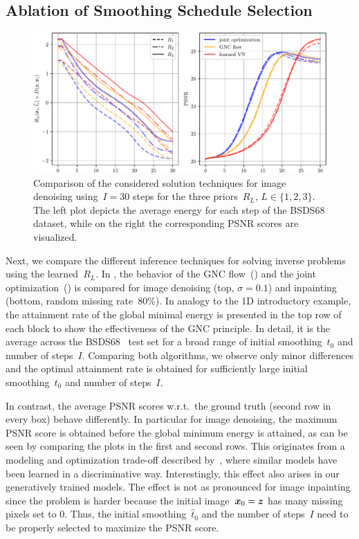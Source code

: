 \documentclass{article}
\def\hatt{{\widehat{t}}}
\theoremstyle{plain}
\theoremstyle{definition}
\theoremstyle{remark}
\begin{document}
\subsection{Ablation of Smoothing Schedule Selection}
\begin{figure}[t]
\centering
\includegraphics[width=.9\linewidth]{figures/results/plots_denoise}
\caption{
Comparison of the considered solution techniques for image denoising using~$I=30$ steps for the three priors~$R_L$, $L\in\{1,2,3\}$.
The left plot depicts the average energy for each step of the BSDS68 dataset, while on the right the corresponding PSNR scores are visualized.
}
\label{fig:allThreeComparison}
\end{figure}
Next, we compare the different inference techniques for solving inverse problems using the learned~$R_L$.
In , the behavior of the GNC flow~() and the joint optimization~() is compared for image denoising (top, $\sigma=0.1$) and inpainting (bottom, random missing rate~$80\%$).
In analogy to the 1D introductory example, the attainment rate of the global minimal energy is presented in the top row of each block to show the effectiveness of the GNC principle.
In detail, it is the average across the BSDS68~\cite{MaFo01} test set for a broad range of initial smoothing~$t_0$ and number of steps~$I$.
Comparing both algorithms, we observe only minor differences and the optimal attainment rate is obtained for sufficiently large initial smoothing~$t_0$ and number of steps~$I$.

In contrast, the average PSNR scores w.r.t.~the ground truth (second row in every box) behave differently.
In particular for image denoising, the maximum PSNR score is obtained before the global minimum energy is attained, as can be seen by comparing the plots in the first and second rows.
This originates from a modeling and optimization trade-off described by~\citet{EfKo20}, where similar models have been learned in a discriminative way.
Interestingly, this effect also arises in our generatively trained models.
The effect is not as pronounced for image inpainting since the problem is harder because the initial image~${\bm{x}}_0={\bm{z}}$ has many missing pixels set to $0$.
Thus, the initial smoothing~$\hatt_0$ and the number of steps~$I$ need to be properly selected to maximize the PSNR score.
\end{document}
